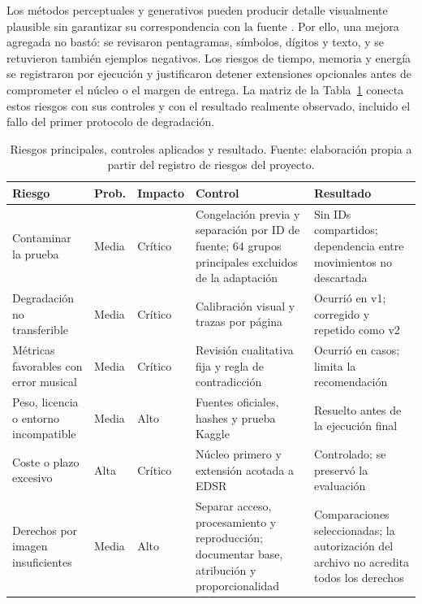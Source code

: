 Los métodos perceptuales y generativos pueden producir detalle visualmente plausible sin garantizar
su correspondencia con la fuente \cite{ledig2017srgan,wang2018esrgan,kim2026fidesr}.
Por ello, una mejora agregada no bastó: se revisaron pentagramas, símbolos, dígitos y texto, y se
retuvieron también ejemplos negativos. Los riesgos de tiempo, memoria y energía se registraron por
ejecución y justificaron detener extensiones opcionales antes de comprometer el núcleo o el margen
de entrega.
La matriz de la Tabla~\ref{tab:risk-matrix} conecta estos riesgos con sus controles y con el
resultado realmente observado, incluido el fallo del primer protocolo de degradación.

\begin{table}[htbp]
  \centering
  \footnotesize
  \setlength{\tabcolsep}{3pt}
  \caption{Riesgos principales, controles aplicados y resultado. Fuente: elaboración propia a
  partir del registro de riesgos del proyecto.}
  \label{tab:risk-matrix}
  \begin{tabular}{p{}p{}p{}p{}p{}}
    \toprule
    Riesgo & Prob. & Impacto & Control & Resultado \\
    \midrule
    Contaminar la prueba & Media & Crítico & Congelación previa y separación por ID de fuente; 64 grupos principales excluidos de la adaptación & Sin IDs compartidos; dependencia entre movimientos no descartada \\
    Degradación no transferible & Media & Crítico & Calibración visual y trazas por página & Ocurrió en v1; corregido y repetido como v2 \\
    Métricas favorables con error musical & Media & Crítico & Revisión cualitativa fija y regla de contradicción & Ocurrió en casos; limita la recomendación \\
    Peso, licencia o entorno incompatible & Media & Alto & Fuentes oficiales, hashes y prueba Kaggle & Resuelto antes de la ejecución final \\
    Coste o plazo excesivo & Alta & Crítico & Núcleo primero y extensión acotada a EDSR & Controlado; se preservó la evaluación \\
    Derechos por imagen insuficientes & Media & Alto & Separar acceso, procesamiento y reproducción; documentar base, atribución y proporcionalidad & Comparaciones seleccionadas; la autorización del archivo no acredita todos los derechos \\
    \bottomrule
  \end{tabular}
\end{table}

